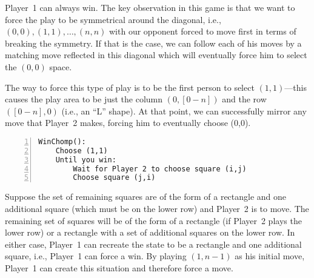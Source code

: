 \begin{comment}
Player~1 can always win. Here is a winning strategy for him: start by eating the square
at $(1,1)$.  Now, it is Player~2's turn and the remaining pieces are a
set of the form $\{ (x,y) | x = 0 \mbox{ or } y = 0, 0 \leq x, y \leq n \}$.
Either Player~2 eats the poisoned square or he eats a square at $(0,k)$ or
$(k,0)$, where $n \geq k >0$.  If Player~2 chooses $(0,k)$, Player~1 can eat the
square at $(k,0)$; if Player~2 chooses $(k,0)$, Player~1 can eat the square at
$(0,k)$. In either case, it is now Player~2's turn and the remaining pieces are
a set of the form $\{ (x,y) | x = 0 \mbox{ or } y = 0, 0 \leq x, y \leq k-1 \}$.
Eventually, this set will become $\{(0,0)\}$ and Player~2 will be forced to eat
the poisoned piece.

Given a $n \times n$ rectangle, in the upper right quadrant in the Cartesian
plane, with the lower leftmost point at $(0, 0)$. Two players take turns at taking a bite out of the 
rectangle. A bite removes a square and all squares above and to the right. The first 
player to eat the square at $(0, 0)$ loses. Construct a winning strategy for Player 1.
\end{comment}
Player~1 can always win. The key observation in this game is that we want to
force the play to be symmetrical around the diagonal, i.e.,
$(0,0), (1,1), \ldots, (n,n)$ with our opponent forced to move first in terms of breaking the symmetry. If that is 
the case, we can follow each of his moves by a matching move reflected in this 
diagonal which will eventually force him 
to select the $(0,0)$ space. 

The way to force this type of play is to be the first person to 
select $(1,1)$---this causes the play area to be just the column $(0, [0-n])$
and the row $([0-n], 0)$ (i.e., an ``L'' shape). At that point, we can
successfully mirror any move that Player~2 makes, forcing him to eventually
choose (0,0).

\begin{lstlisting}[basicstyle=\footnotesize,numbers=left,breaklines=true]
WinChomp():
    Choose (1,1)
    Until you win:
        Wait for Player 2 to choose square (i,j)
        Choose square (j,i)
\end{lstlisting}

Suppose the set of remaining squares are of the form of a rectangle and one
additional square (which must be on the lower row) and Player~2 is to move.  The remaining set of squares will be of the form of a rectangle (if Player~2
plays the lower row) or a rectangle with a set of additional squares on the
lower row.  In either case, Player~1 can recreate the state to be a rectangle and one additional square, i.e., Player~1 can force a win.
By playing $(1,n-1)$ as his initial move, Player~1 can create this situation and therefore force a move.


